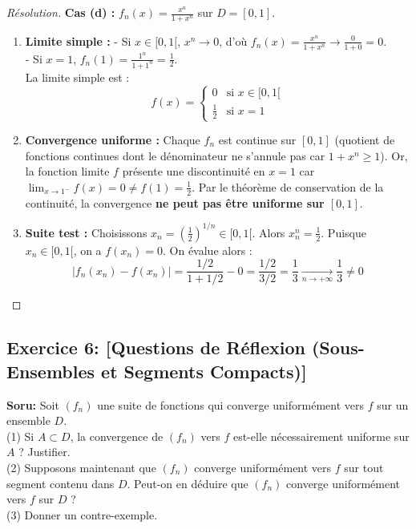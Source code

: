 \documentclass[12pt,a4paper]{report}
\begin{document}
\begin{proof}[Résolution]
\textbf{Cas (d) :} $f_n(x) = \frac{x^n}{1 + x^n}$ sur $D = [0, 1]$.
\begin{enumerate}
    \item \textbf{Limite simple :}
    - Si $x \in [0, 1[$, $x^n \to 0$, d'où $f_n(x) = \frac{x^n}{1+x^n} \to \frac{0}{1+0} = 0$.\\
    - Si $x = 1$, $f_n(1) = \frac{1^n}{1+1^n} = \frac{1}{2}$.\\
    La limite simple est :
    \[ f(x) = \begin{cases} 0 & \text{si } x \in [0, 1[ \\ \frac{1}{2} & \text{si } x = 1 \end{cases} \]
    \item \textbf{Convergence uniforme :}
    Chaque $f_n$ est continue sur $[0, 1]$ (quotient de fonctions continues dont le dénominateur ne s'annule pas car $1+x^n \ge 1$).
    Or, la fonction limite $f$ présente une discontinuité en $x = 1$ car $\lim_{x \to 1^-} f(x) = 0 \neq f(1) = \frac{1}{2}$.
    Par le théorème de conservation de la continuité, la convergence \textbf{ne peut pas être uniforme sur $[0, 1]$}.
    \item \textbf{Suite test :} Choisissons $x_n = \left(\frac{1}{2}\right)^{1/n} \in [0, 1[$.
    Alors $x_n^n = \frac{1}{2}$.
    Puisque $x_n \in [0, 1[$, on a $f(x_n) = 0$.
    On évalue alors :
    \[ |f_n(x_n) - f(x_n)| = \frac{1/2}{1 + 1/2} - 0 = \frac{1/2}{3/2} = \frac{1}{3} \xrightarrow[n \to +\infty]{} \frac{1}{3} \neq 0 \]
\end{enumerate}
\end{proof}

\subsection*{Exercice 6: [Questions de Réflexion (Sous-Ensembles et Segments Compacts)]}

\textbf{Soru:}
Soit $(f_n)$ une suite de fonctions qui converge uniformément vers $f$ sur un ensemble $D$.\\
(1) Si $A \subset D$, la convergence de $(f_n)$ vers $f$ est-elle nécessairement uniforme sur $A$ ? Justifier.\\
(2) Supposons maintenant que $(f_n)$ converge uniformément vers $f$ sur tout segment contenu dans $D$. Peut-on en déduire que $(f_n)$ converge uniformément vers $f$ sur $D$ ?\\
(3) Donner un contre-exemple.
\end{document}
